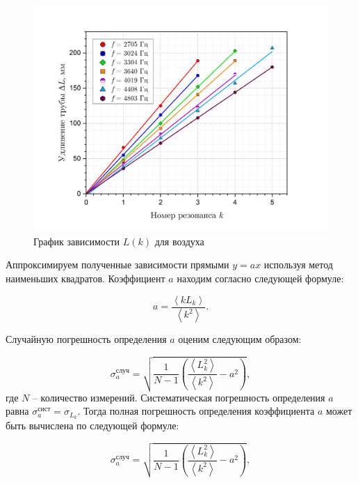 \documentclass[a4paper, 12pt]{article}
\begin{document}
            \begin{figure}[H]
                \centering
                \includegraphics[scale = 0.5]{images/L(k).png}
                \caption{График зависимости $L(k)$ для воздуха}
                \label{graph1}
            \end{figure}

            \noindent Аппроксимируем полученные зависимости прямыми $y=ax$ используя метод наименьших квадратов. Коэффициент $a$ находим согласно следующей формуле:

             \begin{equation}                
                a=\frac{\left\langle kL_k \right\rangle}{\left\langle k^2 \right\rangle}.
            \end{equation}

            \noindent Случайную погрешность определения $ a $ оценим следующим образом:
            
            \begin{equation}
                \sigma^\text{случ}_a=\sqrt{\frac{1}{N-1}\left(\frac{\left\langle L_k^2 \right\rangle}{\left\langle k^2 \right\rangle}-a^2\right)},
            \end{equation}
            \noindent где $N$ -- количество измерений. Систематическая погрешность определения $a$ равна $\sigma_a^\text{сист} = \sigma_{L_k}$. Тогда полная погрешность определения коэффициента $a$ может быть вычислена по следующей формуле:

            \begin{equation}
                \sigma^\text{случ}_a=\sqrt{\frac{1}{N-1}\left(\frac{\left\langle L_k^2 \right\rangle}{\left\langle k^2 \right\rangle}-a^2\right)},
            \end{equation}
\end{document}
